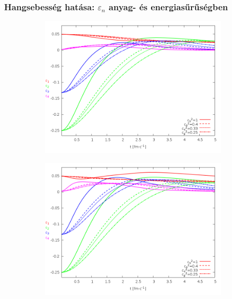 \documentclass{beamer}
\begin{document}
\begin{frame}[noframenumbering]
\frametitle{Hangsebesség hatása: $\varepsilon_n$ anyag- és energiasűrűségben}
\begin{center}
\begin{figure}[H]
	\centering
    \begin{subfigure}[b]{0.49\textwidth}
    		\includegraphics[width=\textwidth]{pic/res/nonrel/eps_cs2_r}
	\end{subfigure}
	\begin{subfigure}[b]{0.49\textwidth}
        	\includegraphics[width=\textwidth]{pic/res/nonrel/eps_cs2_p}
	\end{subfigure}
\end{figure}
\end{center}
\end{frame}
\end{document}
